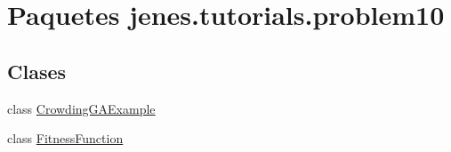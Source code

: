 \hypertarget{namespacejenes_1_1tutorials_1_1problem10}{\section{Paquetes jenes.\-tutorials.\-problem10}
\label{namespacejenes_1_1tutorials_1_1problem10}
}
\subsection*{Clases}
\begin{DoxyCompactItemize}
\item 
class \hyperlink{classjenes_1_1tutorials_1_1problem10_1_1_crowding_g_a_example}{Crowding\-G\-A\-Example}
\item 
class \hyperlink{classjenes_1_1tutorials_1_1problem10_1_1_fitness_function}{Fitness\-Function}
\end{DoxyCompactItemize}
